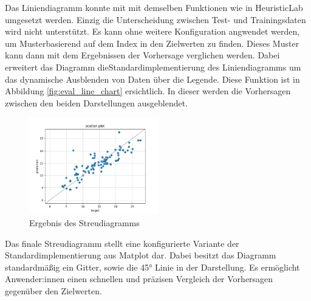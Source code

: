 \noindent Das Liniendiagramm konnte mit mit demselben Funktionen wie in HeuristicLab umgesetzt werden. Einzig die Unterscheidung zwischen Test- und Trainingsdaten wird nicht unterstützt. Es kann ohne weitere Konfiguration angwendet werden, um Muster\linebreak basierend auf dem Index in den Zielwerten zu finden. Dieses Muster kann dann mit dem Ergebnissen der Vorhersage verglichen werden. Dabei erweitert das Diagramm die\linebreak Standardimplementierung des Liniendiagramms um das dynamische Ausblenden von Daten über die Legende. Diese Funktion ist in Abbildung \ref{fig:eval_line_chart} ersichtlich. In dieser werden die Vorhersagen zwischen den beiden Darstellungen ausgeblendet.

\begin{figure}[H]
    \centering
    \includegraphics[width=0.5\textwidth]{images/exm_scatterplot.png}
    \caption{Ergebnis des Streudiagramms}
    \label{fig:eval_scatter_plott}
\end{figure}

\noindent Das finale Streudiagramm stellt eine konfigurierte Variante der Standardimplementierung aus Matplot dar. Dabei besitzt das Diagramm standardmäßig ein Gitter, sowie die 45° Linie in der Darstellung. Es ermöglicht Anwender:innen einen schnellen und präzisen Vergleich der Vorhersagen gegenüber den Zielwerten.

